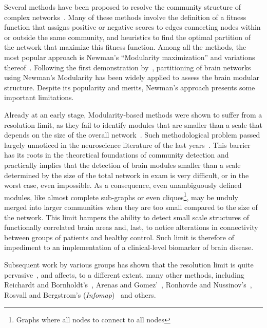 Several methods have been proposed to resolve the community structure of complex networks~\cite{fortunato2010,lancichinetti2009,fortunato2016}.
Many of these methods involve the definition of a fitness function that assigns positive or negative scores to edges connecting nodes within or outside the same community, and heuristics to find the optimal partition of the network that maximize this fitness function.
Among all the methods, the most popular approach is Newman's ``Modularity maximization'' and variations thereof~\cite{newman2006}.
Following the first demonstration by~\cite{schwarz2008}, partitioning of brain networks using Newman's Modularity has been widely applied to assess the brain modular structure.
Despite its popularity and merits, Newman's approach presents some important limitations.

Already at an early stage, Modularity-based methods were shown to suffer from a resolution limit, as they fail to identify modules that are smaller than a scale that depends on the size of the overall network~\cite{fortunato2007}.
Such methodological problem passed largely unnoticed in the neuroscience literature of the last years~\cite{articolimodularity}.
This barrier has its roots in the theoretical foundations of community detection and practically implies that the detection of brain modules smaller than a scale determined by the size of the total network in exam is very difficult, or in the worst case, even impossible. As a consequence, even unambiguously defined modules, like almost complete sub-graphs or even cliques\footnote{Graphs where all nodes to connect to all nodes}, may be unduly merged into larger communities when they are too small compared to the size of the network.
This limit hampers the ability to detect small scale structures of functionally correlated brain areas and, last, to notice alterations in connectivity between groups of patients and healthy control. Such limit is therefore of impediment to an implementation of a clinical-level biomarker of brain disease.

Subsequent work by various groups has shown that the resolution limit is quite pervasive~\cite{lancichinetti2009,traag2011,squartini2015,lancichinetti2011,kawamoto2015}, and affects, to a different extent, many other methods, including Reichardt and Bornholdt’s~\cite{reichardt2006}, Arenas and Gomez'~\cite{arenas2008}, Ronhovde and Nussinov's~\cite{ronhovde2009}, Rosvall and Bergstrom's (\emph{Infomap})~\cite{rosvall2008,kawamoto2015} and others.

